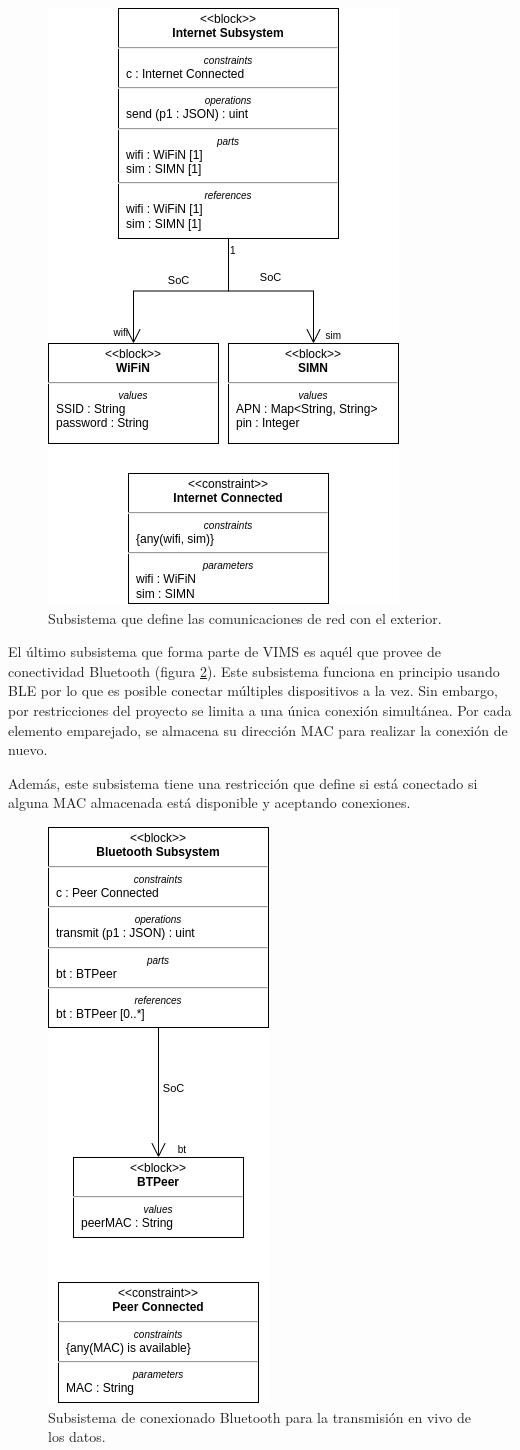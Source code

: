 \begin{figure}[H]
  \centering
  \includegraphics[width=.5\linewidth]{images/BD-Internet.png}
  \caption{Subsistema que define las comunicaciones de red con el exterior.}
  \label{fig:bd-internet}
\end{figure}

El último subsistema que forma parte de \ac{VIMS} es aquél que provee de conectividad
Bluetooth (figura \ref{fig:bd-bluetooth}). Este subsistema funciona en principio
usando \ac{BLE} por lo que es posible conectar múltiples dispositivos a la vez. Sin
embargo, por restricciones del proyecto se limita a una única conexión simultánea.
Por cada elemento emparejado, se almacena su dirección MAC para realizar la conexión
de nuevo.

Además, este subsistema tiene una restricción que define si está conectado si alguna
MAC almacenada está disponible y aceptando conexiones.

\begin{figure}[H]
  \centering
  \includegraphics[width=.3\linewidth]{images/BD-Bluetooth.png}
  \caption{Subsistema de conexionado Bluetooth para la transmisión en vivo de los datos.}
  \label{fig:bd-bluetooth}
\end{figure}

